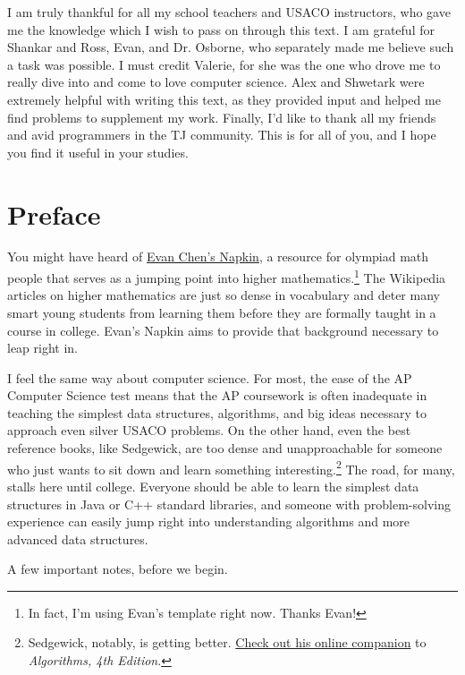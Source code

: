 \documentclass[11pt]{book}
\begin{document}
I am truly thankful for all my school teachers and USACO instructors, who gave me the knowledge which I wish to pass on through this text. I am grateful for Shankar and Ross, Evan, and Dr. Osborne, who separately made me believe such a task was possible. I must credit Valerie, for she was the one who drove me to really dive into and come to love computer science. Alex and Shwetark were extremely helpful with writing this text, as they provided input and helped me find problems to supplement my work. Finally, I'd like to thank all my friends and avid programmers in the TJ community. This is for all of you, and I hope you find it useful in your studies.

\tableofcontents

\chapter{Preface}

You might have heard of \href{https://www.dropbox.com/s/z8qdndxmrmxqsam/Napkin.pdf?oref=e&n=97419869}{Evan Chen's Napkin}, a resource for olympiad math people that serves as a jumping point into higher mathematics.\footnote{In fact, I'm using Evan's template right now. Thanks Evan!} The Wikipedia articles on higher mathematics are just so dense in vocabulary and deter many smart young students from learning them before they are formally taught in a course in college. Evan's Napkin aims to provide that background necessary to leap right in.

I feel the same way about computer science. For most, the ease of the AP Computer Science test means that the AP coursework is often inadequate in teaching the simplest data structures, algorithms, and big ideas necessary to approach even silver USACO problems. On the other hand, even the best reference books, like Sedgewick, are too dense and unapproachable for someone who just wants to sit down and learn something interesting.\footnote{Sedgewick, notably, is getting better. \href{http://algs4.cs.princeton.edu/home/}{Check out his online companion} to \textit{Algorithms, 4th Edition}.} The road, for many, stalls here until college. Everyone should be able to learn the simplest data structures in Java or C++ standard libraries, and someone with problem-solving experience can easily jump right into understanding algorithms and more advanced data structures.

A few important notes, before we begin.
\end{document}
